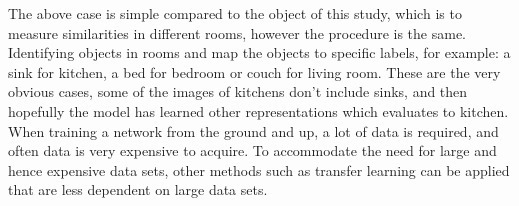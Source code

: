 The above case is simple compared to the object of this study, which is to measure similarities in different rooms, however the procedure is the same. Identifying objects in rooms and map the objects to specific labels, for example: a sink for kitchen, a bed for bedroom or couch for living room. These are the very obvious cases, some of the images of kitchens don't include sinks, and then hopefully the model has learned other representations which evaluates to kitchen. When training a network from the ground and up, a lot of data is required, and often data is very expensive to acquire. To accommodate the need for large and hence expensive data sets, other methods such as transfer learning can be applied that are less dependent on large data sets.
